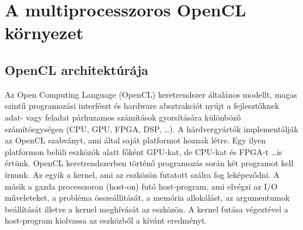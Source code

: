 \chapter{A multiprocesszoros OpenCL környezet}

\section{OpenCL architektúrája}
	Az Open Computing Language (OpenCL) keretrendszer \cite{opencl}
	általános modellt, magas szintű programozási interfészt és hardware
	absztrakciót nyújt a fejlesztőknek adat- vagy feladat párhuzamos számítások gyorsítására különböző
	számítóegységen (CPU, GPU, FPGA, DSP, \ldots).
	A hárdvergyártók implementálják az OpenCL szabványt, ami által saját platformot
	hoznak létre. Egy ilyen platformon belüli eszközök alatt főként GPU-kat, de
	CPU-kat és FPGA-t \ldots is értünk.
	OpenCL keretrendszerben történő programozás során két programot kell írnunk.
	Az egyik a kernel, ami az eszközön futatott szálra fog leképeződni.
	A másik a gazda processzoron (host-on) futó host-program, ami elvégzi az I/O műveleteket,
	a probléma összeállítását, a memória allokálást, az argumentumok beállítását
	illetve a kernel meghívását az eszközön.
	A kernel futása végeztével a host-program kiolvassa az eszközből
	a kívánt eredményt.
	
